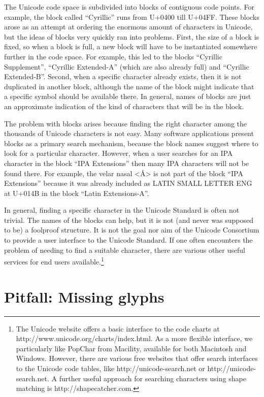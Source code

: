 The Unicode code space is subdivided into blocks of contiguous code points. For example, the block called ``Cyrillic'' runs from U+0400 till U+04FF. These blocks arose as an attempt at ordering the enormous amount of characters in Unicode, but the ideas of blocks very quickly ran into problems. First, the size of a block is fixed, so when a block is full, a new block will have to be instantiated somewhere further in the code space. For example, this led to the blocks ``Cyrillic Supplement'', ``Cyrillic Extended-A'' (which are also already full) and ``Cyrillic Extended-B''. Second, when a specific character already exists, then it is not duplicated in another block, although the name of the block might indicate that a specific symbol should be available there. In general, names of blocks are just an approximate indication of the kind of characters that will be in the block.

The problem with blocks arises because finding the right character among the thousands of Unicode characters is not easy. Many software applications present blocks as a primary search mechanism, because the block names suggest where to look for a particular character. However, when a user searches for an IPA character in the block ``IPA Extensions'' then many IPA characters will not be found there. For example, the velar nasal <Å> is not part of the block ``IPA Extensions'' because it was already included as LATIN SMALL LETTER ENG at U+014B in the block ``Latin Extensions-A''.

In general, finding a specific character in the Unicode Standard is often not trivial. The names of the blocks can help, but it is not (and never was supposed to be) a foolproof structure. It is not the goal nor aim of the Unicode Consortium to provide a user interface to the Unicode Standard. If one often encounters the problem of needing to find a suitable character, there are various other useful services for end users available.\footnote{The Unicode website offers a basic interface to the code charts at http://www.unicode.org/charts/index.html. As a more flexible interface, we particularly like PopChar from Macility, available for both Macintosh and Windows. However, there are various free websites that offer search interfaces to the Unicode code tables, like http://unicode-search.net or http://unicode-search.net. A further useful approach for searching characters using shape matching is http://shapecatcher.com.}

\section{Pitfall: Missing glyphs}
\label{pitfall-missing-glyphs}

